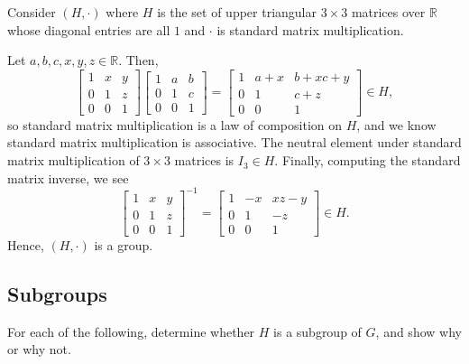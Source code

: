 \begin{exer}
Consider $ (H,\cdot) $ where $ H $ is the set of upper triangular $ 3\times 3 $ matrices over $ \mathbb{R} $ whose diagonal entries are all $ 1 $ and $ \cdot $ is standard matrix multiplication.
\end{exer}
\begin{sltn}
Let $ a,b,c,x,y,z\in\mathbb{R} $. Then,
\begin{equation*}
    \begin{bmatrix}
        1 & x & y \\
        0 & 1 & z \\
        0 & 0 & 1
    \end{bmatrix}
    \begin{bmatrix}
        1 & a & b \\
        0 & 1 & c \\
        0 & 0 & 1
    \end{bmatrix}
    =
    \begin{bmatrix}
        1 & a+x & b+xc+y \\
        0 & 1 & c+z \\
        0 & 0 & 1
    \end{bmatrix}
    \in H,
\end{equation*}
so standard matrix multiplication is a law of composition on $ H $, and we know standard matrix multiplication is associative. The neutral element under standard matrix multiplication of $ 3\times 3 $ matrices is $ I_3\in H $. Finally, computing the standard matrix inverse, we see
\begin{equation*}
    \begin{bmatrix}
        1 & x & y \\
        0 & 1 & z \\
        0 & 0 & 1
    \end{bmatrix}^{-1}
    =
    \begin{bmatrix}
        1 & -x & xz-y \\
        0 & 1 & -z \\
        0 & 0 & 1
    \end{bmatrix}
    \in H.
\end{equation*}
Hence, $ (H,\cdot) $ is a group.
\end{sltn}

\subsection*{Subgroups}

For each of the following, determine whether $ H $ is a subgroup of $ G $, and show why or why not.

